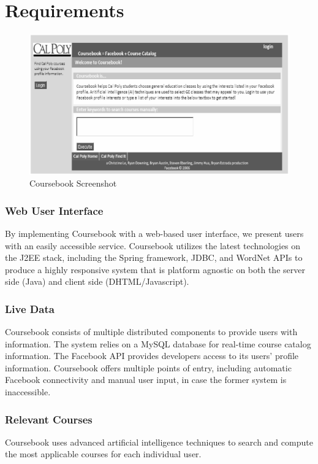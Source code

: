 \section{Requirements}

\begin{figure}[t]
  \begin{center}
  \includegraphics[scale=0.75]{images/screenshot}
  \caption{Coursebook Screenshot}
  \label{fig:screenshot}
  \end{center}
\end{figure}

\subsubsection*{Web User Interface}
By implementing Coursebook with a web-based user interface, we present users 
with an easily accessible service. Coursebook utilizes the latest technologies 
on the J2EE stack, including the Spring framework, JDBC, and WordNet APIs to 
produce a highly responsive system that is platform agnostic on both the server
side (Java) and client side (DHTML/Javascript).

\subsubsection*{Live Data}
Coursebook consists of multiple distributed components to provide users with 
information. The system relies on a MySQL database for real-time course catalog
information. The Facebook API provides developers access to its users' profile 
information. Coursebook offers multiple points of entry, including automatic 
Facebook connectivity and manual user input, in case the former system is 
inaccessible.

\subsubsection*{Relevant Courses}
Coursebook uses advanced artificial intelligence techniques to search and 
compute the most applicable courses for each individual user.


